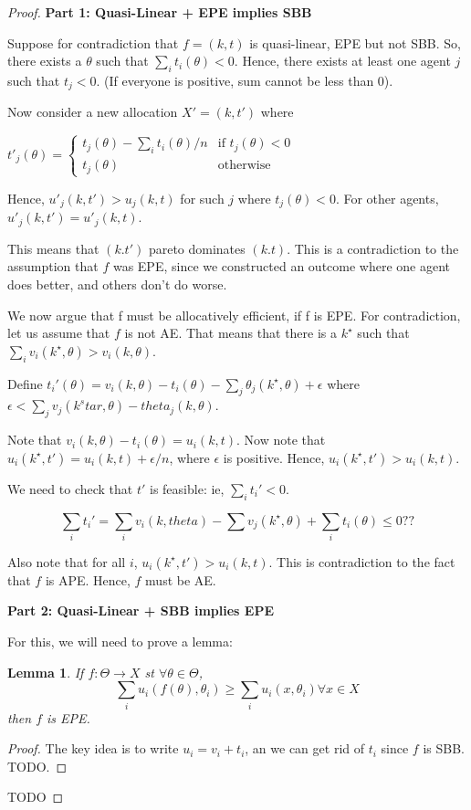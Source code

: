 \documentclass[10pt,a4paper]{article}
\newtheorem{lemma}{Lemma}
\begin{document}
\begin{proof}
\textbf{Part 1: Quasi-Linear + EPE implies SBB}

Suppose for contradiction that $f = (k, t)$ is quasi-linear, EPE but not SBB.
So, there exists a $\theta$ such that 
$\sum_i t_i(\theta) < 0$. Hence, there exists at least
one agent $j$ such that $t_j < 0$. (If everyone is positive, sum cannot be less than 0).

Now consider a new allocation $X' = (k, t')$ where 

$t'_j(\theta) = 
\begin{cases}
    t_j(\theta) -  \sum_i t_i(\theta)/n & \text{if $t_j(\theta) < 0$} \\
    t_j(\theta) & \text{otherwise}
\end{cases}
$ 

Hence, $u'_j(k, t') > u_j(k, t)$ for such $j$ where $t_j(\theta) < 0$.
For other agents, $u'_j(k, t') = u'_j(k, t)$.

This means that $(k. t')$ pareto dominates $(k. t)$. This is a contradiction
to the assumption that $f$ was EPE, since we constructed an outcome where
one agent does better, and others don't do worse.

We now argue that f must be allocatively efficient, if  f is EPE. For contradiction,
let us assume that $f$ is not AE.
That means that there is a $k^\star$ such that
$\sum_i v_i(k^\star, \theta) > v_i (k, \theta)$.

Define $t_i'(\theta)  = v_i(k, \theta) - t_i (\theta) - \sum_j \theta_j(k^\star, \theta) + \epsilon$
where $\epsilon < \sum_j v_j(k^star, \theta) - theta_j (k, \theta)$.

Note that $v_i(k, \theta) - t_i (\theta)  = u_i(k, t)$. 
Now note that
$u_i(k^\star, t') = u_i(k, t) + \epsilon/n$, where $\epsilon$ is positive.
Hence, $u_i(k^\star, t') > u_i(k, t)$. 

We need to check that $t'$ is feasible: ie, $\sum_i t_i' < 0$.

$$
\sum_i t_i' = \sum_i v_i(k, theta) - \sum v_j(k^\star, \theta) + \sum_i t_i(\theta) \leq 0??
$$

Also note that for all $i$, $u_i(k^\star, t') > u_i(k, t)$. This is contradiction
to the fact that $f$ is APE. Hence, $f$ must be AE.

\textbf{Part 2: Quasi-Linear + SBB implies EPE}

For this, we will need to prove a lemma:

\begin{lemma}
If $f: \Theta \rightarrow X$ st $\forall \theta \in \Theta$,
$$
\sum_i u_i(f(\theta), \theta_i) \geq \sum_i u_i(x, \theta_i) \forall x \in X
$$
then $f$ is EPE.

\end{lemma}
\begin{proof}
The key idea is to write $u_i = v_i + t_i$, an we can get rid of $t_i$ since
$f$ is SBB. TODO.
\end{proof}

TODO
\end{proof}
\end{document}
